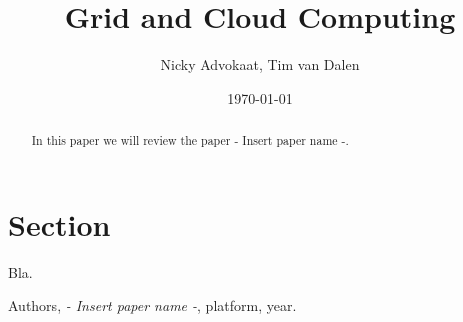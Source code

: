 \documentclass[a4paper]{article}
\title{Grid and Cloud Computing \\ \paper}
\author{Nicky Advokaat, Tim van Dalen}
\date{\today}
\newcommand{\paper}{- Insert paper name -}
\begin{document}
\maketitle

\begin{abstract}
In this paper we will review the paper \paper \cite{thepaper}.  
\end{abstract}

\section{Section}
Bla.

\begin{thebibliography}{9}

  Authors,
  \emph{\paper},
  platform, year.

 
\end{thebibliography}
\end{document}
